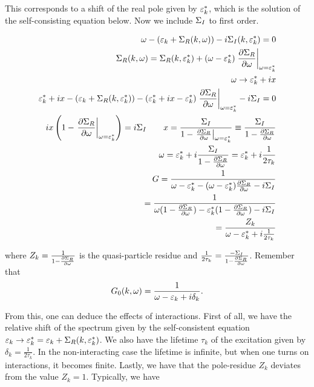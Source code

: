 This corresponds to a shift of the real pole given by $\varepsilon_k^*$, which is the solution of the self-consisting equation below. Now we include $\Sigma_I$ to first order.

\begin{align*}
    \omega - (\ep_k + \s_R(k,\omega)) - i\s_I(k,\ep_k^*) = 0 \\
    \s_R(k, \omega) = \s_R(k, \ep_k^*) + (\omega - \ep_k^*)\eval{\pdv{\s_R}{\omega}}_{\omega = \ep_k^*} \\ 
    \omega \to \ep_k^* + ix \\ 
    \ep_k^* + ix - (\ep_k + \s_R(k,\ep_k^*)) - (\ep_k^* + ix - \ep_k^*)\eval{\pdv{\s_R}{\omega}}_{\omega = \ep_k^*} -i\s_I = 0 \\ 
    ix\left(1 - \eval{\pdv{\s_R}{\omega}}_{\omega = \ep_k^*}\right) = i\s_I \quad \quad 
    x = \frac{\s_I}{1 - \eval{\pdv{\s_R}{\omega}}_{\omega = \ep_k^*}} \equiv \frac{\s_I}{1 - \pdv{\s_R}{\omega}} \\ 
    \omega = \ep_k^* + i \frac{\s_I}{1 - \pdv{\s_R}{\omega}} = \ep_k^* + i\frac{1}{2\tau_k} \\
    G = \frac{1}{\omega - \ep_k^* - (\omega - \ep_k^*)\pdv{\s_R}{\omega} - i\s_I} \\ 
    = \frac{1}{\omega(1- \pdv{\s_R}{\omega}) - \ep_k^*(1 - \pdv{\s_R}{\omega}) - i\s_I} \\ 
    = \frac{Z_k}{\omega - \ep_k^* +i\frac{1}{2\tau_k}}
\end{align*}

where $Z_k = \frac{1}{1 - \pdv{\Sigma_R}{\omega}}$ is the quasi-particle residue and $\frac{1}{2\tau_k} = \frac{-\Sigma_I}{1 - \pdv{\Sigma_R}{\omega}}$. Remember that \\ 

\begin{align*}
    G_0(k, \omega) = \frac{1}{\omega - \varepsilon_k + i \delta_k}. 
\end{align*}

From this, one can deduce the effects of interactions.  First of all, we have the relative shift of the spectrum given by the self-consistent equation $\varepsilon_k \to \varepsilon^*_k = \varepsilon_k + \Sigma_R(k, \varepsilon^*_k)$. We also have the lifetime $\tau_k$ of the excitation given by $\delta_k = \frac{1}{2\tau_k}$. In the non-interacting case the lifetime is infinite, but when one turns on interactions, it becomes finite. Lastly, we have that the pole-residue $Z_k$ deviates from the value $Z_k = 1$. Typically, we have \\ 

\begin{figure}
	\centering
    
\end{figure}

